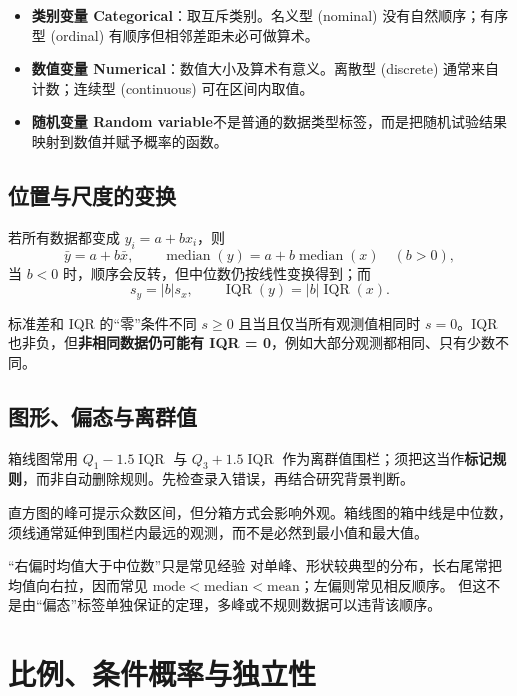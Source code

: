 \documentclass[11pt,a4paper,fontset=fandol]{ctexart}
\begin{document}
\begin{itemize}
  \item \textbf{类别变量 Categorical}：取互斥类别。名义型 (nominal) 没有自然顺序；有序型 (ordinal) 有顺序但相邻差距未必可做算术。
  \item \textbf{数值变量 Numerical}：数值大小及算术有意义。离散型 (discrete) 通常来自计数；连续型 (continuous) 可在区间内取值。
  \item \textbf{随机变量 Random variable}不是普通的数据类型标签，而是把随机试验结果映射到数值并赋予概率的函数。
\end{itemize}

\subsection{位置与尺度的变换}

若所有数据都变成 $y_i=a+b x_i$，则
\[
  \bar y=a+b\bar x, \qquad
  \operatorname{median}(y)=a+b\operatorname{median}(x)\quad (b>0),
\]
当 $b<0$ 时，顺序会反转，但中位数仍按线性变换得到；而
\[
  s_y=|b|s_x, \qquad \operatorname{IQR}(y)=|b|\operatorname{IQR}(x).
\]

\begin{trapbox}{标准差和 IQR 的“零”条件不同}
$s\geq0$ 且当且仅当所有观测值相同时 $s=0$。IQR 也非负，但\textbf{非相同数据仍可能有 IQR = 0}，例如大部分观测都相同、只有少数不同。
\end{trapbox}

\subsection{图形、偏态与离群值}

箱线图常用 $Q_1-1.5\operatorname{IQR}$ 与 $Q_3+1.5\operatorname{IQR}$ 作为离群值围栏；须把这当作\textbf{标记规则}，而非自动删除规则。先检查录入错误，再结合研究背景判断。

直方图的峰可提示众数区间，但分箱方式会影响外观。箱线图的箱中线是中位数，须线通常延伸到围栏内最远的观测，而不是必然到最小值和最大值。

\begin{trapbox}{“右偏时均值大于中位数”只是常见经验}
对单峰、形状较典型的分布，长右尾常把均值向右拉，因而常见
$\text{mode}<\text{median}<\text{mean}$；左偏则常见相反顺序。
但这不是由“偏态”标签单独保证的定理，多峰或不规则数据可以违背该顺序。
\end{trapbox}

\section{比例、条件概率与独立性}
\end{document}
